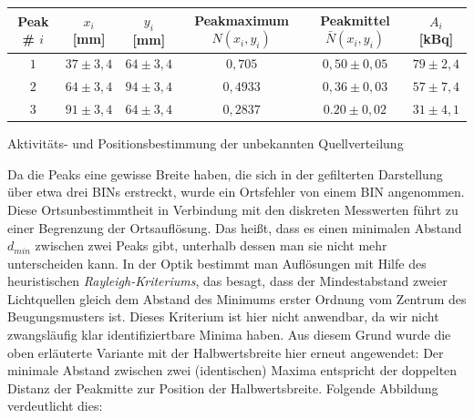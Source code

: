              \begin{tabular}{c|c|c|c|c|c}
             				Peak \# $i$ 	& 	$x_i$ [mm] 	& 	$y_i$ [mm] 	& Peakmaximum $N(x_i, y_i)$ & Peakmittel $\bar{N}(x_i,y_i)$ & $A_i$ [kBq]\\
             	\hline		$1$				&	$37 \pm 3,4$& $64 \pm 3,4$&	$0,705$					& $0,50 \pm 0,05$				& $79 \pm 2,4$\\
             				$2$				&	$64 \pm 3,4$& $94 \pm 3,4$&	$0,4933$				& $0,36 \pm 0,03$				& $57 \pm 7,4$\\
             				$3$				&	$91 \pm 3,4$& $64 \pm 3,4$&	$0,2837$				& $0.20 \pm 0,02$				& $31 \pm 4,1$\\
             \end{tabular}
             \caption{Aktivitäts- und Positionsbestimmung der unbekannten Quellverteilung}
             \vspace{3mm}  
                      
             Da die Peaks eine gewisse Breite haben, die sich in der gefilterten Darstellung über etwa drei BINs erstreckt, wurde ein Ortsfehler von einem BIN angenommen. Diese Ortsunbestimmtheit in Verbindung mit den diskreten Messwerten führt zu einer Begrenzung der Ortsauflösung. Das heißt, dass es einen minimalen Abstand $d_{min}$ zwischen zwei Peaks gibt, unterhalb dessen man sie nicht mehr unterscheiden kann. In der Optik bestimmt man Auflösungen mit Hilfe des heuristischen \textit{Rayleigh-Kriteriums}, das besagt, dass der Mindestabstand zweier Lichtquellen gleich dem Abstand des Minimums erster Ordnung vom Zentrum des Beugungsmusters ist. Dieses Kriterium ist hier nicht anwendbar, da wir nicht zwangsläufig klar identifiziertbare Minima haben. Aus diesem Grund wurde die oben erläuterte Variante mit der Halbwertsbreite hier erneut angewendet: Der minimale Abstand zwischen zwei (identischen) Maxima entspricht der doppelten Distanz der Peakmitte zur Position der Halbwertsbreite. Folgende Abbildung verdeutlicht dies:\\
             

